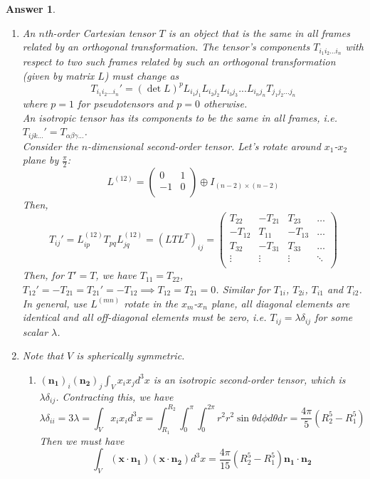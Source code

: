 \documentclass[a4paper]{article}
\newtheorem{ans}{Answer}[section]
\theoremstyle{new}
\begin{document}
\begin{ans}\leavevmode
\begin{enumerate}[label=(\alph*)]
\item An $n$th-order Cartesian tensor $T$ is an object that is the same in all frames related by an orthogonal transformation. The tensor's components $T_{i_1i_2...i_n}$ with respect to two such frames related by such an orthogonal transformation (given by matrix $L$) must change as 
$$T_{i_1i_2...i_n}'=(\det L)^pL_{i_1j_1}L_{i_2j_2}L_{i_3j_3}...L_{i_nj_n}T_{j_1j_2...j_n}$$
where $p=1$ for pseudotensors and $p=0$ otherwise.\\[5pt]
An isotropic tensor has its components to be the same in all frames, i.e. $T_{ijk...}'=T_{\alpha\beta\gamma...}$.\\[5pt]
Consider the $n$-dimensional second-order tensor. Let's rotate around $x_1$-$x_2$ plane by $\frac{\pi}{2}$:
$$L^{(12)}=\begin{pmatrix}0&1\\-1&0\\\end{pmatrix}\oplus I_{(n-2)\times(n-2)}$$
Then, 
$$T_{ij}'=L_{ip}^{(12)}T_{pq}L_{jq}^{(12)}=(LTL^T)_{ij}=\begin{pmatrix}T_{22}&-T_{21}&T_{23}&\dots\\-T_{12}&T_{11}&-T_{13}&\dots\\T_{32}&-T_{31}&T_{33}&\dots\\\vdots&\vdots&\vdots&\ddots\\\end{pmatrix}$$
Then, for $T'=T$, we have $T_{11}=T_{22}$, $T_{12}'=-T_{21}=T_{21}'=-T_{12}\implies T_{12}=T_{21}=0$. Similar for $T_{1i}$, $T_{2i}$, $T_{i1}$ and $T_{i2}$. In general, use $L^{(mn)}$ rotate in the $x_m$-$x_n$ plane, all diagonal elements are identical and all off-diagonal elements must be zero, i.e. $T_{ij}=\lambda\delta_{ij}$ for some scalar $\lambda$.
\item Note that $V$ is spherically symmetric.
\begin{enumerate}[label=(\roman*)]
    \item $(\mathbf{n_1})_i(\mathbf{n_2})_j\int_Vx_ix_jd^3x$ is an isotropic second-order tensor, which is $\lambda\delta_{ij}$. Contracting this, we have
    $$\lambda\delta_{ii}=3\lambda=\int_Vx_ix_id^3x=\int_{R_1}^{R_2}\int_0^\pi\int_0^{2\pi}r^2r^2\sin\theta d\phi d\theta dr=\frac{4\pi}{5}(R_2^5-R_1^5)$$
    Then we must have
    $$\int_V(\mathbf{x}\cdot\mathbf{n_1})(\mathbf{x}\cdot\mathbf{n_2})d^3x=\frac{4\pi}{15}(R_2^5-R_1^5)\mathbf{n_1}\cdot\mathbf{n_2}$$

\end{enumerate}
\end{enumerate}
\end{ans}
\end{document}
